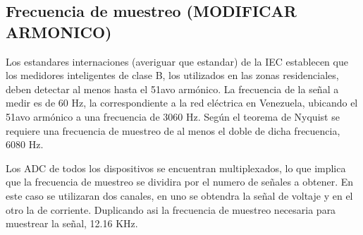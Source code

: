   \begin{table}[H]
   \centering
   \caption{\label{Especificaciones_dispositivos_comerciales_evaluados}Especificaciones de los dispositivos comerciales evaluados}
  \end{table}

  \subsection{Frecuencia de muestreo (MODIFICAR ARMONICO)}
  \par Los estandares internaciones (averiguar que estandar) de la IEC establecen
  que los medidores inteligentes de clase B, los utilizados en las zonas residenciales,
  deben detectar al menos hasta el 51avo armónico. La frecuencia de la señal a medir es de 60 Hz, la
  correspondiente a la red eléctrica en Venezuela, ubicando el 51avo armónico a una frecuencia de
  3060 Hz. Según el teorema de Nyquist se requiere una frecuencia de muestreo de al menos el doble
  de dicha frecuencia, 6080 Hz.
  \par Los ADC de todos los dispositivos se encuentran multiplexados, lo que implica que
  la frecuencia de muestreo se dividira por el numero de señales a obtener. En este caso
  se utilizaran dos canales, en uno se obtendra la señal de voltaje y en el otro la de
  corriente. Duplicando asi la frecuencia de muestreo necesaria para muestrear la señal,
  12.16 KHz.

